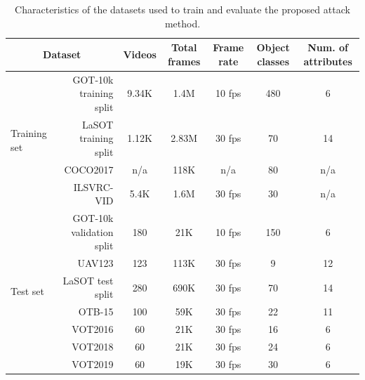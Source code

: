 \documentclass[journal]{IEEEtran}
\begin{document}
\begin{table}[t]
  \centering
  \caption{Characteristics of the datasets used to train and evaluate the proposed attack method.}
  \begin{tabular}{lrccccc} \toprule
  \multicolumn{2}{c}{Dataset}                            & Videos & Total frames & Frame rate & Object classes & Num. of attributes \\ \midrule
  \multirow{4}{*}{Training set} & GOT-10k training split & 9.34K  & 1.4M        & 10 fps     & 480            & 6                  \\
                                & LaSOT training split   & 1.12K  & 2.83M        & 30 fps     & 70             & 14                 \\
                                & COCO2017               & n/a    & 118K         & n/a        & 80             & n/a                \\
                                & ILSVRC-VID             & 5.4K   & 1.6M         & 30 fps     & 30             & n/a                \\ \midrule
  \multirow{7}{*}{Test set}     & GOT-10k validation split& 180   & 21K          & 10 fps     & 150            & 6                  \\
                                & UAV123                 & 123    & 113K         & 30 fps     & 9              & 12                 \\
                                & LaSOT test split       & 280    & 690K         & 30 fps     & 70             & 14                 \\
                                & OTB-15                 & 100    & 59K          & 30 fps     & 22             & 11                 \\
                                & VOT2016                & 60     & 21K          & 30 fps     & 16             & 6                  \\
                                & VOT2018                & 60     & 21K          & 30 fps     & 24             & 6                  \\ 
                                & VOT2019                & 60     & 19K          & 30 fps     & 30             & 6                  \\ \bottomrule
  \end{tabular}
  \label{tab:dataset}
\end{table}
\end{document}

